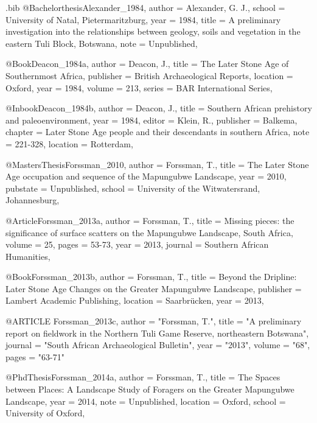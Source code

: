 \begin{filecontents}{\IJSRAidentifier.bib}
@Bachelorthesis{Alexander_1984,
  author = {Alexander, G. J.},
  school = {University of Natal, Pietermaritzburg},
  year   = {1984},
  title  = {A preliminary investigation into the relationships between geology, soils and vegetation in the eastern Tuli Block, Botswana},
  note   = {Unpublished},
}

@Book{Deacon_1984a,
  author    = {Deacon, J.},
  title     = {The Later Stone Age of Southernmost Africa},
  publisher = {British Archaeological Reports},
  location  = {Oxford},
  year      = {1984},
  volume    = {213},
  series    = {BAR International Series},
}

@Inbook{Deacon_1984b,
  author    = {Deacon, J.},
  title     = {Southern African prehistory and paleoenvironment},
  year      = {1984},
  editor    = {Klein, R.},
  publisher = {Balkema},
  chapter   = {Later Stone Age people and their descendants in southern Africa},
  note      = {221-328},
  location  = {Rotterdam},
}

@MastersThesis{Forssman_2010,
  author   = {Forssman, T.},
  title    = {The Later Stone Age occupation and sequence of the Mapungubwe Landscape},
  year     = {2010},
  pubstate = {Unpublished},
  school   = {University of the Witwatersrand, Johannesburg},
}

@Article{Forssman_2013a,
  author  = {Forssman, T.},
  title   = {Missing pieces: the significance of surface scatters on the Mapungubwe Landscape, South Africa},
  volume  = {25},
  pages   = {53-73},
  year    = {2013},
  journal = {Southern African Humanities},
}

@Book{Forssman_2013b,
  author    = {Forssman, T.},
  title     = {Beyond the Dripline: Later Stone Age Changes on the Greater Mapungubwe Landscape},
  publisher = {Lambert Academic Publishing},
  location  = {Saarbrücken},
  year      = {2013},
}


@ARTICLE {Forssman_2013c,
author  = "Forssman, T.",
title   = "A preliminary report on fieldwork in the Northern Tuli Game Reserve, northeastern Botswana",
journal = "South African Archaeological Bulletin",
year    = "2013",
volume  = "68",
pages   = "63-71"
}

@PhdThesis{Forssman_2014a,
  author   = {Forssman, T.},
  title    = {The Spaces between Places: A Landscape Study of Foragers on the Greater Mapungubwe Landscape},
  year     = {2014},
  note     = {Unpublished},
  location = {Oxford},
  school   = {University of Oxford},
}



\end{filecontents}
